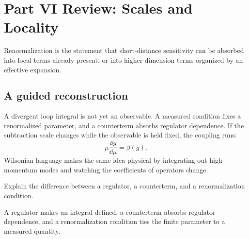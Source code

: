 
\chapter{Part VI Review: Scales and Locality}

Renormalization is the statement that short-distance sensitivity can be absorbed into local terms already present, or into higher-dimension terms organized by an effective expansion.

\section{A guided reconstruction}













A divergent loop integral is not yet an observable.  A measured condition fixes a renormalized parameter, and a counterterm absorbs regulator dependence.  If the subtraction scale changes while the observable is held fixed, the coupling runs:
\[
  \mu\frac{\dd g}{\dd\mu}=\beta(g).
\]
Wilsonian language makes the same idea physical by integrating out high-momentum modes and watching the coefficients of operators change.

\begin{exercise}
Explain the difference between a regulator, a counterterm, and a renormalization condition.
\begin{answer}
A regulator makes an integral defined, a counterterm absorbs regulator dependence, and a renormalization condition ties the finite parameter to a measured quantity.
\end{answer}
\end{exercise}
